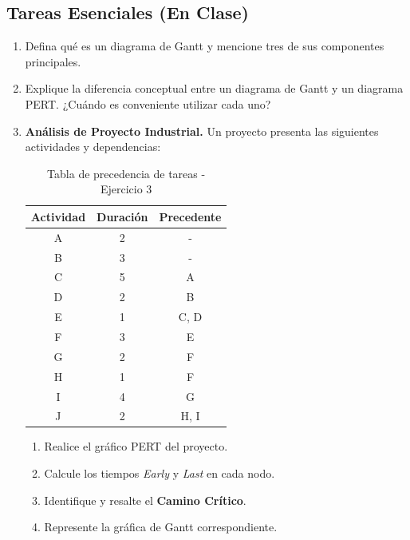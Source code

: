 \documentclass[../main]{subfiles}
\begin{document}
\subsection*{Tareas Esenciales (En Clase)}
\begin{enumerate}
  \item Defina qué es un diagrama de Gantt y mencione tres de sus componentes principales.
  \item Explique la diferencia conceptual entre un diagrama de Gantt y un diagrama PERT. ¿Cuándo es conveniente utilizar cada uno?

  \item \textbf{Análisis de Proyecto Industrial.}
    Un proyecto presenta las siguientes actividades y dependencias:

    \begin{table}[h!]
      \centering
      \begin{tabular}{|c|c|c|} \hline
        \textbf{Actividad} & \textbf{Duración} & \textbf{Precedente}
        \\ \hline \hline
        A & 2 & - \\
        B & 3 & - \\
        C & 5 & A \\
        D & 2 & B \\
        E & 1 & C, D \\
        F & 3 & E \\
        G & 2 & F \\
        H & 1 & F \\
        I & 4 & G \\
        J & 2 & H, I \\ \hline
      \end{tabular}
      \caption{Tabla de precedencia de tareas - Ejercicio 3}
      \label{tab:ejercicio_3}
    \end{table}

    \begin{enumerate}
      \item Realice el gráfico PERT del proyecto.
      \item Calcule los tiempos \textit{Early} y \textit{Last} en cada nodo.
      \item Identifique y resalte el \textbf{Camino Crítico}.
      \item Represente la gráfica de Gantt correspondiente.
    \end{enumerate}
\end{enumerate}
\end{document}
